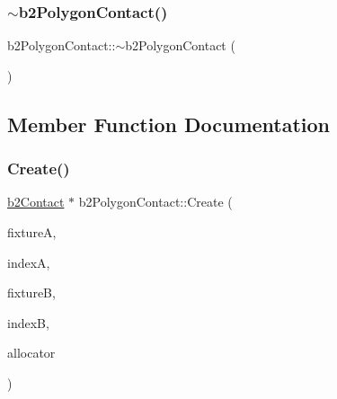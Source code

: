 \mbox{\label{classb2_polygon_contact_a438093c76d08fc66459eeac9c35807db}} 
\subsubsection{\texorpdfstring{$\sim$b2PolygonContact()}{~b2PolygonContact()}}
{\footnotesize\ttfamily b2\+Polygon\+Contact\+::$\sim$b2\+Polygon\+Contact (\begin{DoxyParamCaption}{ }\end{DoxyParamCaption})\hspace{0.3cm}{\ttfamily [inline]}}



\subsection{Member Function Documentation}
\mbox{\label{classb2_polygon_contact_a65356af432d877838e14755c5eb3c553}} 
\subsubsection{\texorpdfstring{Create()}{Create()}}
{\footnotesize\ttfamily \mbox{\hyperlink{classb2_contact}{b2\+Contact}} $\ast$ b2\+Polygon\+Contact\+::\+Create (\begin{DoxyParamCaption}\item[{\mbox{\hyperlink{classb2_fixture}{b2\+Fixture}} $\ast$}]{fixtureA,  }\item[{\mbox{\hyperlink{b2_settings_8h_a43d43196463bde49cb067f5c20ab8481}{int32}}}]{indexA,  }\item[{\mbox{\hyperlink{classb2_fixture}{b2\+Fixture}} $\ast$}]{fixtureB,  }\item[{\mbox{\hyperlink{b2_settings_8h_a43d43196463bde49cb067f5c20ab8481}{int32}}}]{indexB,  }\item[{\mbox{\hyperlink{classb2_block_allocator}{b2\+Block\+Allocator}} $\ast$}]{allocator }\end{DoxyParamCaption})\hspace{0.3cm}{\ttfamily [static]}}

